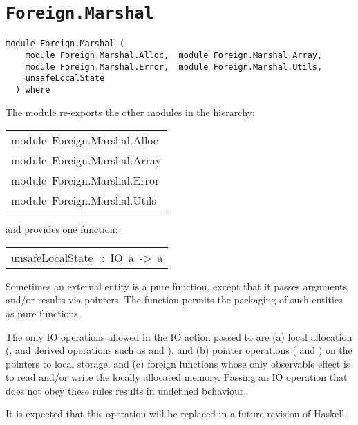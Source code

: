 \chapter{\texttt{Foreign.Marshal}}
\label{module:Foreign.Marshal}
\haddockbeginheader
{\haddockverb\begin{verbatim}
module Foreign.Marshal (
    module Foreign.Marshal.Alloc,  module Foreign.Marshal.Array, 
    module Foreign.Marshal.Error,  module Foreign.Marshal.Utils, 
    unsafeLocalState
  ) where\end{verbatim}}
\haddockendheader

The module  re-exports the other modules in the
  hierarchy:
\par

\begin{haddockdesc}
\item[\begin{tabular}{@{}l}
module\ Foreign.Marshal.Alloc\\module\ Foreign.Marshal.Array\\module\ Foreign.Marshal.Error\\module\ Foreign.Marshal.Utils
\end{tabular}]
\end{haddockdesc}
and provides one function:
\par

\begin{haddockdesc}
\item[\begin{tabular}{@{}l}
unsafeLocalState\ ::\ IO\ a\ ->\ a
\end{tabular}]\haddockbegindoc
Sometimes an external entity is a pure function, except that it passes
arguments and/or results via pointers.  The function
 permits the packaging of such entities as pure
functions.  
\par
The only IO operations allowed in the IO action passed to
 are (a) local allocation (, 
and derived operations such as  and ), and (b)
pointer operations ( and ) on the
pointers to local storage, and (c) foreign functions whose only
observable effect is to read and/or write the locally allocated
memory.  Passing an IO operation that does not obey these rules
results in undefined behaviour.
\par
It is expected that this operation will be
replaced in a future revision of Haskell.
\par

\end{haddockdesc}